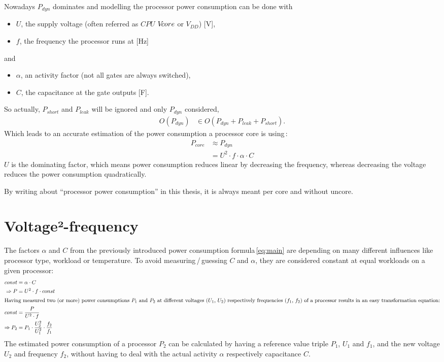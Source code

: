\noindent
Nowadays $P_{dyn}$ dominates\cite{power} and modelling the processor power consumption can be done with 
\begin{itemize}
	\item $U$, the supply voltage (often referred as $CPU$ $V\kern-0.3em core$ or $V_{DD}$) [V],
	\item $f$, the frequency the processor runs at [Hz]
\end{itemize}
and
\begin{itemize}
	\item $\alpha$, an activity factor (not all gates are always switched),
	\item $C$, the capacitance at the gate outputs [F].
\end{itemize}
%
So actually, $P_{short}$ and $P_{leak}$ will be ignored and only $P_{dyn}$ considered, 
%
\begin{align}
O(P_{dyn}) &\in O(P_{dyn} + P_{leak} + P_{short}). \nonumber
\end{align}
%
Which leads to an accurate estimation of the power consumption a processor core is using\,\cite{minartz}:
%
\begin{align}
P_{core} &\approx P_{dyn}\nonumber\\
&= U^2 \cdot f \cdot \alpha \cdot C\label{eq:main}
\end{align}
%
$U$ is the dominating factor, which means power consumption reduces linear by decreasing the frequency, whereas decreasing the voltage reduces the power consumption quadratically.

By writing about ``processor power consumption'' in this thesis, it is always meant per core and without uncore.

%
%
\section{Voltage²-frequency}
The factors $\alpha$ and $C$ from the previously introduced power consumption formula\,\eqref{eq:main} are depending on many different influences like processor type, workload or temperature. To avoid measuring\,/\,guessing $C$ and $\alpha$, they are considered constant at equal workloads on a given processor:
%
\begin{align}
const &= \alpha \cdot C \nonumber \\
\Rightarrow P &= U^2 \cdot f \cdot const \nonumber \\
%
\intertext{%
Having measured two (or more) power consumptions $P_{1}$ and $P_{2}$ at different voltages ($U_1$, $U_2$) respectively frequencies ($f_1$, $f_2$) of a processor results in an easy transformation equation:}
%
\label{eq:V2f}
const &= \frac{P}{U^2 \cdot f} \nonumber \\
\Rightarrow P_{2} &= P_{1} \cdot \frac{U^2_2}{U^2_1} \cdot \frac{f_2}{f_1}
\end{align}
%
The estimated power consumption of a processor $P_{2}$ can be calculated by having a reference value triple $P_{1}$, $U_1$ and $f_1$, and the new voltage $U_2$ and frequency $f_2$, without having to deal with the actual activity $\alpha$ respectively capacitance $C$.

